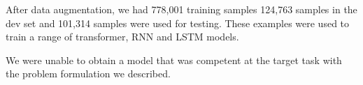 After data augmentation, we had 778,001 training samples 124,763 samples in the dev set and 101,314 samples were used for testing. These examples were used to train a range of transformer, RNN and LSTM models.

We were unable to obtain a model that was competent at the target task with the problem formulation we described.
